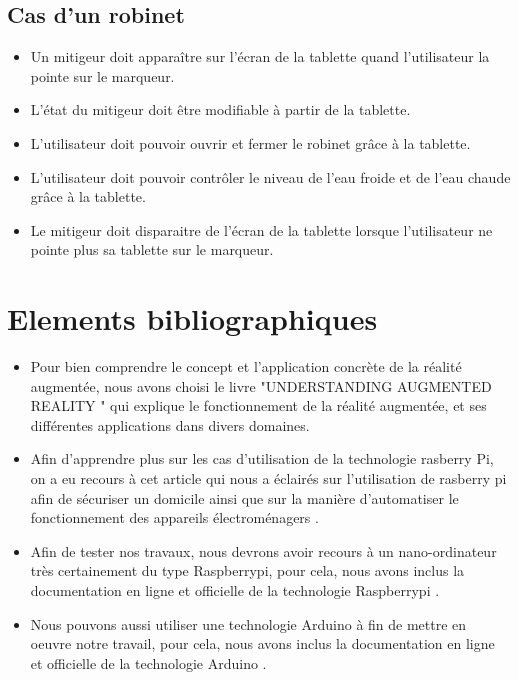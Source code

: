 \documentclass[12pt,a4paper]{article}
\begin{document}
\subsection{Cas d'un robinet}
\begin{itemize} 
  \item Un mitigeur doit apparaître sur l'écran de la tablette quand l'utilisateur la pointe sur le marqueur.
  \item L'état du mitigeur doit être modifiable à partir de la tablette.
  \item L'utilisateur doit pouvoir ouvrir et fermer le robinet grâce à la tablette.
  \item L'utilisateur doit pouvoir contrôler le niveau de l'eau froide et de l'eau chaude grâce à la tablette.
  \item Le mitigeur doit disparaitre de l'écran de la tablette lorsque l'utilisateur ne pointe plus sa tablette sur le marqueur.
\end{itemize}

\newpage
\section{Elements bibliographiques}

\begin{itemize}
  \item Pour bien comprendre le concept et l'application concrète de la réalité augmentée, nous avons choisi le livre "UNDERSTANDING AUGMENTED REALITY "\cite{Ref1} qui explique le fonctionnement de la réalité augmentée, et ses différentes applications dans divers domaines.
  \item Afin d'apprendre plus sur les cas d'utilisation de la technologie rasberry Pi, on a eu recours à cet article qui nous a éclairés sur l'utilisation de rasberry pi afin de sécuriser un domicile ainsi que sur la manière d'automatiser le fonctionnement des appareils \'electrom\'enagers \cite{Ref2}.
  \item Afin de tester nos travaux, nous devrons avoir recours à un nano-ordinateur très certainement du type Raspberrypi, pour cela, nous avons inclus la documentation en ligne et officielle de la technologie Raspberrypi \cite{Ref3}.
  \item Nous pouvons aussi utiliser une technologie Arduino à fin de mettre en oeuvre notre travail, pour cela, nous avons inclus la documentation en ligne et officielle de la technologie Arduino \cite{Ref4}. 
\end{itemize}
\end{document}
